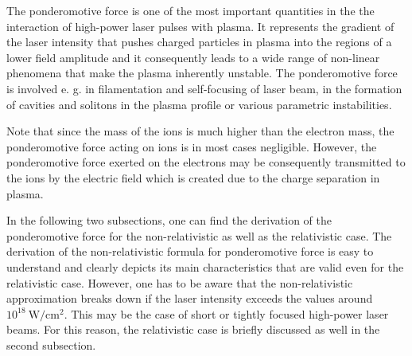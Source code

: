 The ponderomotive force is one of the most important quantities in the the interaction of high-power laser pulses with plasma. It represents the gradient of the laser intensity that pushes charged particles in plasma into the regions of a lower field amplitude and it consequently leads to a wide range of non-linear phenomena that make the plasma inherently unstable. The ponderomotive force is involved e. g. in filamentation and self-focusing of laser beam, in the formation of cavities and solitons in the plasma profile or various parametric instabilities.

Note that since the mass of the ions is much higher than the electron mass, the ponderomotive force acting on ions is in most cases negligible. However, the ponderomotive force exerted on the electrons may be consequently transmitted to the ions by the electric field which is created due to the charge separation in plasma.

In the following two subsections, one can find the derivation of the ponderomotive force for the non-relativistic as well as the relativistic case. The derivation of the non-relativistic formula for ponderomotive force is easy to understand and clearly depicts its main characteristics that are valid even for the relativistic case. However, one has to be aware that the non-relativistic approximation breaks down if the laser intensity exceeds the values around $ 10^{18} \ \mathrm{W/cm^2} $. This may be the case of short or tightly focused high-power laser beams. For this reason, the relativistic case is briefly discussed as well in the second subsection.